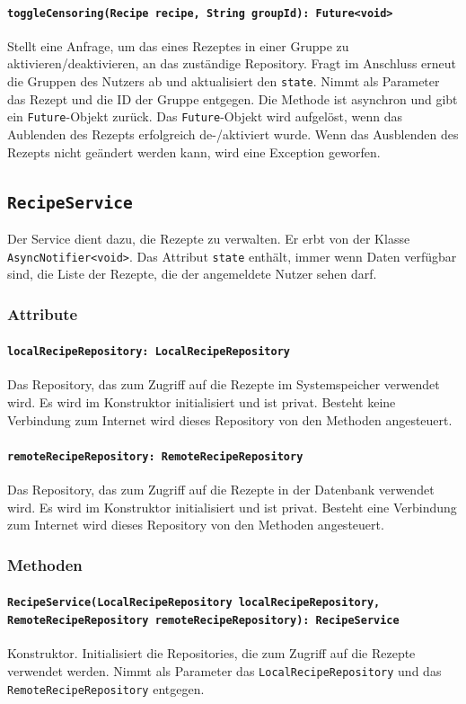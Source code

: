 \documentclass{entwurfsheft}
\begin{document}
\begin{sloppypar}
\paragraph{\texttt{toggleCensoring(Recipe recipe, String groupId): Future<void>}}
Stellt eine Anfrage, um das  eines Rezeptes in einer Gruppe zu aktivieren/deaktivieren, an das zuständige Repository. Fragt im Anschluss erneut die Gruppen des Nutzers ab und aktualisiert den \texttt{state}. Nimmt als Parameter das Rezept und die ID der Gruppe entgegen. Die Methode ist asynchron und gibt ein \texttt{Future}-Objekt zurück. Das \texttt{Future}-Objekt wird aufgelöst, wenn das Aublenden des Rezepts erfolgreich de-/aktiviert wurde. Wenn das Ausblenden des Rezepts nicht geändert werden kann, wird eine Exception geworfen.

\newpage
\subsection{\texttt{RecipeService}}
\label{sec:recipeService}
Der Service dient dazu, die Rezepte zu verwalten. Er erbt von der Klasse \texttt{AsyncNotifier<void>}. Das Attribut \texttt{state} enthält, immer wenn Daten verfügbar sind, die Liste der Rezepte, die der angemeldete Nutzer sehen darf.
\subsubsection*{Attribute}
\paragraph{\texttt{localRecipeRepository: LocalRecipeRepository}}
Das Repository, das zum Zugriff auf die Rezepte im Systemspeicher verwendet wird. Es wird im Konstruktor initialisiert und ist privat. Besteht keine Verbindung zum Internet wird dieses Repository von den Methoden angesteuert.
\paragraph{\texttt{remoteRecipeRepository: RemoteRecipeRepository}}
Das Repository, das zum Zugriff auf die Rezepte in der Datenbank verwendet wird. Es wird im Konstruktor initialisiert und ist privat. Besteht eine Verbindung zum Internet wird dieses Repository von den Methoden angesteuert.
\subsubsection*{Methoden}
\paragraph{\texttt{RecipeService(LocalRecipeRepository localRecipeRepository, RemoteRecipeRepository remoteRecipeRepository): RecipeService\\}}
Konstruktor. Initialisiert die Repositories, die zum Zugriff auf die Rezepte verwendet werden. Nimmt als Parameter das \texttt{LocalRecipeReposi\-tory} und das \texttt{RemoteRecipeRepository} entgegen.

\end{sloppypar}
\end{document}
